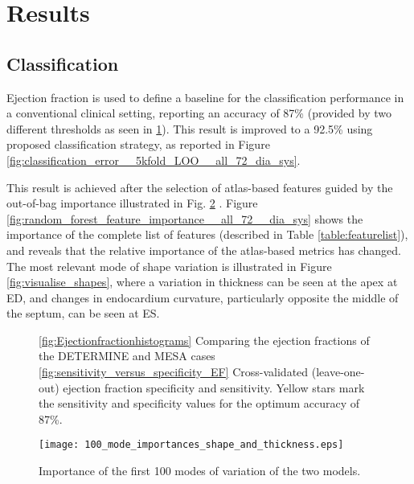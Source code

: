 \documentclass{llncs}
\begin{document}
\section{Results}
	\subsection{Classification}
Ejection fraction is used to define a baseline for the classification performance in a conventional clinical setting, reporting an accuracy of 87\% (provided by two different thresholds as seen in \ref{fig:EFs}). This result is improved to a 92.5\% using proposed classification strategy, as reported in Figure    \ref{fig:classification_error__5kfold_LOO__all_72_dia_sys}. 

This result is achieved after the selection of atlas-based features guided by the out-of-bag importance illustrated in Fig. \ref{fig:random_forest_feature_importance__100_shape_eigenvalues__and_100_thickness_modes_dia_sys} . Figure \ref{fig:random_forest_feature_importance__all_72__dia_sys} shows the importance of the complete list of features (described in Table \ref{table:featurelist}), and reveals that the relative importance of the atlas-based metrics has changed. The most relevant mode of shape variation is illustrated in Figure \ref{fig:visualise_shapes}, where a variation in thickness can be seen at the apex at ED, and changes in endocardium curvature, particularly opposite the middle of the septum, can be seen at ES. 

		
		\begin{figure}[]
		\qquad
\begin{center} 

\!

\caption{ \ref{fig:Ejectionfractionhistograms} Comparing the ejection fractions of the DETERMINE and MESA cases \ref{fig:sensitivity_versus_specificity_EF} Cross-validated (leave-one-out) ejection fraction specificity and sensitivity. Yellow stars mark the sensitivity and specificity values for the optimum accuracy of 87\%.}
\label{fig:EFs}
\end{center}    

		\end{figure}

		\begin{figure}[]
		\begin{center}
		
		\texttt{[image: 100\_mode\_importances\_shape\_and\_thickness.eps]}
	\caption{Importance of the first 100 modes of variation of the two models.}	
\label{fig:random_forest_feature_importance__100_shape_eigenvalues__and_100_thickness_modes_dia_sys}			\end{center}
		\end{figure}
\end{document}
